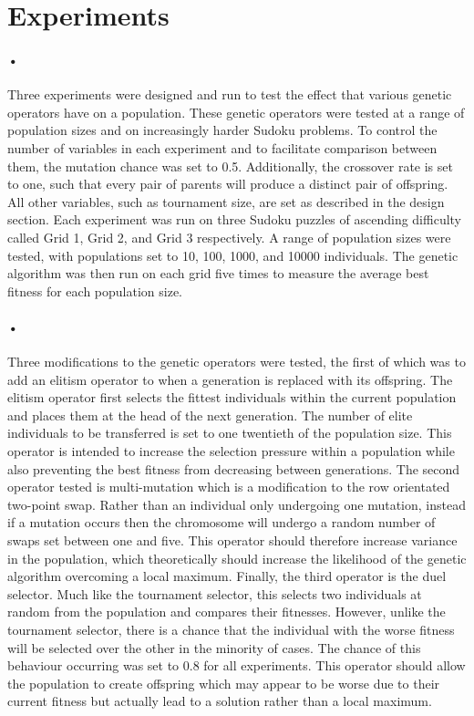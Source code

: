 \documentclass[10pt]{article}
\begin{document}
\section{Experiments}
\paragraph{•}
Three experiments were designed and run to test the effect that various genetic operators have on a population. These genetic operators were tested at a range of population sizes and on increasingly harder Sudoku problems. To control the number of variables in each experiment and to facilitate comparison between them, the mutation chance was set to 0.5. Additionally, the crossover rate is set to one, such that every pair of parents will produce a distinct pair of offspring. All other variables, such as tournament size, are set as described in the design section. Each experiment was run on three Sudoku puzzles of ascending difficulty called Grid 1, Grid 2, and Grid 3 respectively. A range of population sizes were tested, with populations set to 10, 100, 1000, and 10000 individuals. The genetic algorithm was then run on each grid five times to measure the average best fitness for each population size.

\paragraph{•}Three modifications to the genetic operators were tested, the first of which was to add an elitism operator to when a generation is replaced with its offspring. The elitism operator first selects the fittest individuals within the current population and places them at the head of the next generation. The number of elite individuals to be transferred is set to one twentieth of the population size.  This operator is intended to increase the selection pressure within a population while also preventing the best fitness from decreasing between generations. The second operator tested is multi-mutation which is a modification to the row orientated two-point swap. Rather than an individual only undergoing one mutation, instead if a mutation occurs then the chromosome will undergo a random number of swaps set between one and five. This operator should therefore increase variance in the population, which theoretically should increase the likelihood of the genetic algorithm overcoming a local maximum. Finally, the third operator is the duel selector. Much like the tournament selector, this selects two individuals at random from the population and compares their fitnesses. However, unlike the tournament selector, there is a chance that the individual with the worse fitness will be selected over the other in the minority of cases. The chance of this behaviour occurring was set to 0.8 for all experiments. This operator should allow the population to create offspring which may appear to be worse due to their current fitness but actually lead to a solution rather than a local maximum.
\end{document}
